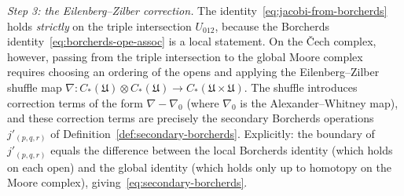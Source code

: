\begin{remark}
\smallskip\noindent\emph{Step 3: the Eilenberg--Zilber correction.}
The identity~\eqref{eq:jacobi-from-borcherds} holds \emph{strictly}
on the triple intersection $U_{012}$, because the Borcherds
identity~\eqref{eq:borcherds-ope-assoc} is a local statement.
On the \v{C}ech complex, however, passing from the triple
intersection to the global Moore complex requires choosing an
ordering of the opens and applying the Eilenberg--Zilber shuffle
map
$\nabla\colon C_*(\mathfrak{U}) \otimes C_*(\mathfrak{U})
\to C_*(\mathfrak{U} \times \mathfrak{U})$.
The shuffle introduces correction terms of the form
$\nabla - \nabla_0$ (where $\nabla_0$ is the Alexander--Whitney
map), and these correction terms are precisely the secondary
Borcherds operations $j'_{(p,q,r)}$ of
Definition~\ref{def:secondary-borcherds}. Explicitly: the
boundary of $j'_{(p,q,r)}$ equals the difference between the
local Borcherds identity (which holds on each open) and the
global identity (which holds only up to homotopy on the Moore
complex), giving~\eqref{eq:secondary-borcherds}.
\end{remark}

